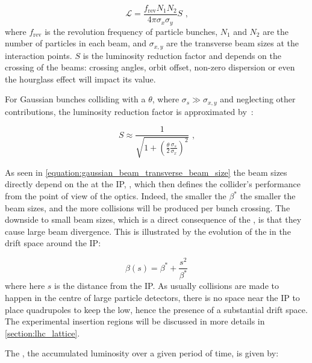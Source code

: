 \begin{equation}
    \mathcal{L} = \frac{f_{\mathrm{rev}} N_1 N_2}{4 \pi \sigma_x \sigma_y} S \text{ ,}
    \label{equation:luminosity_gaussian_beams}
\end{equation}
where \(f_{\mathrm{rev}}\) is the revolution frequency of particle bunches, \(N_1\) and \(N_2\) are the number of particles in each beam, and \(\sigma_{x,y}\) are the transverse beam sizes at the interaction points.
\(S\) is the luminosity reduction factor and depends on the crossing of the beams: crossing angles, orbit offset, non-zero dispersion or even the hourglass effect will impact its value.

For Gaussian bunches colliding with a  \(\theta\), where \(\sigma_s \gg \sigma_{x,y}\) and neglecting other contributions, the luminosity reduction factor is approximated by~\cite{CERN:Herr:Concept_Luminosity}:

\begin{equation}
    S \approx \frac{1}{\sqrt{1 + \left( \frac{\theta}{2} \frac{\sigma_s}{\sigma_x} \right)^2}} \text{ ,}
    \label{equation:luminosity_reduction_factor}
\end{equation}

As seen in \cref{equation:gaussian_beam_transverse_beam_size} the beam sizes directly depend on the \betafunction at the IP, \betastar, which then defines the collider's performance from the point of view of the optics.
Indeed, the smaller the \(\beta^{\ast}\) the smaller the beam sizes, and the more collisions will be produced per bunch crossing. 
The downside to small beam sizes, which is a direct consequence of the , is that they cause large beam divergence.
This is illustrated by the evolution of the \betafunction in the drift space around the IP:

\begin{equation}
    \beta(s) = \beta^{\ast} + \frac{s^2}{\beta^{\ast}}
    \label{equation:betafunction_drift_space}
\end{equation}
where here \(s\) is the distance from the IP.
As usually collisions are made to happen in the centre of large particle detectors, there is no space near the IP to place quadrupoles to keep the \betafunctions low, hence the presence of a substantial drift space.
The experimental insertion regions will be discussed in more details in \cref{section:lhc_lattice}.

The , the accumulated luminosity over a given period of time, is given by:

